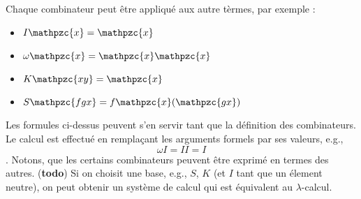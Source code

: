 \documentclass[12pt, a4paper]{article}
\begin{document}
Chaque combinateur peut être appliqué aux autre tèrmes, par exemple :
\begin{itemize}
	\item $I \mathpzc{x} = \mathpzc{x}$
	\item $\omega \mathpzc{x} = \mathpzc{x}\mathpzc{x}$
	\item $K \mathpzc{xy} = \mathpzc{x}$
	\item $S \mathpzc{fgx} = f\mathpzc{x} (\mathpzc{gx})$
\end{itemize}
Les formules ci-dessus peuvent s'en servir tant que la définition des combinateurs.
Le calcul est effectué en remplaçant les arguments formels par ses valeurs, e.g.,
$$\omega I = I I = I$$.
Notons, que les certains combinateurs peuvent être exprimé en termes des autres. (\textbf{todo})
Si on choisit une base, e.g., $S$, $K$ (et $I$ tant que un élement neutre), on peut obtenir un système de calcul qui est équivalent au $\lambda$-calcul.
\end{document}
